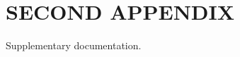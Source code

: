 \documentclass{UCF_ETD}
\begin{document}
\chapter{SECOND APPENDIX}
\newpage

Supplementary documentation.

\backmatter



\end{document}
